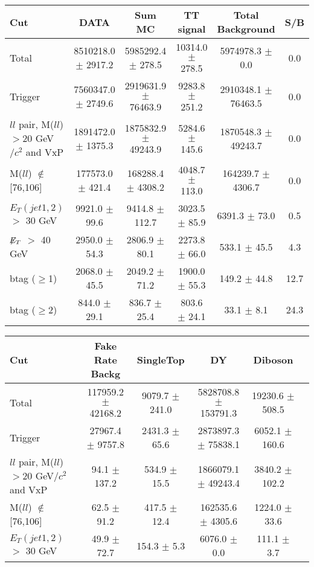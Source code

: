 \documentclass[amsmath,amssymb]{revtex4}
\begin{document}
\clearpage
\begin{landscape}
\begin{table}[p]
\begin{tabular}{|l|c|c|c|c|c|}
\hline
\hline
Cut & DATA & Sum MC & TT signal  & Total Background & S/B \\
\hline
Total & 8510218.0 $\pm$ 2917.2 & 5985292.4 $\pm$ 278.5 & 10314.0 $\pm$ 278.5 & 5974978.3 $\pm$ 0.0 & 0.0 \\
Trigger & 7560347.0 $\pm$ 2749.6 & 2919631.9 $\pm$ 76463.9 & 9283.8 $\pm$ 251.2 & 2910348.1 $\pm$ 76463.5 & 0.0 \\
$ll$ pair, M($ll$)$>$20 GeV$/c^2$ and VxP & 1891472.0 $\pm$ 1375.3 & 1875832.9 $\pm$ 49243.9 & 5284.6 $\pm$ 145.6 & 1870548.3 $\pm$ 49243.7 & 0.0 \\
M($ll$) $\notin$ [76,106]                 & 177573.0 $\pm$ 421.4   & 168288.4 $\pm$ 4308.2  & 4048.7 $\pm$ 113.0 & 164239.7 $\pm$ 4306.7 & 0.0 \\
$E_T(jet1,2)$ $>$ 30 GeV                  & 9921.0 $\pm$ 99.6      & 9414.8 $\pm$ 112.7     &  3023.5 $\pm$ 85.9 & 6391.3 $\pm$ 73.0 & 0.5 \\
$\not\!\!E_T$ $>$ 40 GeV                  & 2950.0 $\pm$ 54.3      & 2806.9 $\pm$ 80.1      & 2273.8 $\pm$ 66.0 & 533.1 $\pm$ 45.5 & 4.3 \\
btag ($\ge$1)                             & 2068.0 $\pm$ 45.5      & 2049.2 $\pm$ 71.2      & 1900.0 $\pm$ 55.3 & 149.2 $\pm$ 44.8 & 12.7 \\
btag ($\ge$2)                             & 844.0 $\pm$ 29.1       & 836.7 $\pm$ 25.4       & 803.6 $\pm$ 24.1 & 33.1 $\pm$ 8.1 & 24.3 \\
\hline
\hline
\end{tabular}
\begin{tabular}{|l|c|c|c|c|c|}
\hline
\hline
Cut & Fake Rate Backg & SingleTop & DY & Diboson  \\
\hline
Total & 117959.2 $\pm$ 42168.2 & 9079.7 $\pm$ 241.0 & 5828708.8 $\pm$ 153791.3 & 19230.6 $\pm$ 508.5 \\
Trigger & 27967.4 $\pm$ 9757.8 & 2431.3 $\pm$ 65.6 & 2873897.3 $\pm$ 75838.1 & 6052.1 $\pm$ 160.6 \\
$ll$ pair, M($ll$)$>$20 GeV$/c^2$ and VxP & 94.1 $\pm$ 137.2 & 534.9 $\pm$ 15.5 & 1866079.1 $\pm$ 49243.4 & 3840.2 $\pm$ 102.2 \\
M($ll$) $\notin$ [76,106] & 62.5 $\pm$ 91.2 & 417.5 $\pm$ 12.4 & 162535.6 $\pm$ 4305.6 & 1224.0 $\pm$ 33.6 \\
$E_T(jet1,2)$ $>$ 30 GeV & 49.9 $\pm$ 72.7 & 154.3 $\pm$ 5.3 & 6076.0 $\pm$ 0.0 & 111.1 $\pm$ 3.7 \\

\end{tabular}
\end{table}
\end{landscape}
\end{document}

